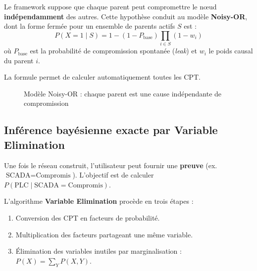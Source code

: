 \documentclass[12pt,a4paper]{article}
\newcommand{\forcereset}[1]{}
\begin{document}
Le framework suppose que chaque parent peut compromettre le nœud \textbf{indépendamment} des autres. Cette hypothèse conduit au modèle \textbf{Noisy-OR}, dont la forme fermée pour un ensemble de parents actifs $S$ est :
\[
P(X = 1 \mid S) = 1 - (1 - P_{\text{base}}) \prod_{i \in S} (1 - w_i)
\]
où $P_{\text{base}}$ est la probabilité de compromission spontanée (\emph{leak}) et $w_i$ le poids causal du parent $i$.

La formule permet de calculer automatiquement toutes les CPT.

\begin{figure}[H]
\centering
{}
\caption{Modèle Noisy-OR : chaque parent est une cause indépendante de compromission}
\label{fig:noisyor}
\end{figure}

\subsection{Inférence bayésienne exacte par Variable Elimination}
\forcereset{5}

Une fois le réseau construit, l'utilisateur peut fournir une \textbf{preuve} (ex. $\text{SCADA} = \text{Compromis}$). L'objectif est de calculer $P(\text{PLC} \mid \text{SCADA} = \text{Compromis})$.

L'algorithme \textbf{Variable Elimination} procède en trois étapes :

\begin{enumerate}
    \item Conversion des CPT en facteurs de probabilité.
    \item Multiplication des facteurs partageant une même variable.
    \item Élimination des variables inutiles par marginalisation : $P(X) = \sum_{Y} P(X,Y)$.
\end{enumerate}
\end{document}
